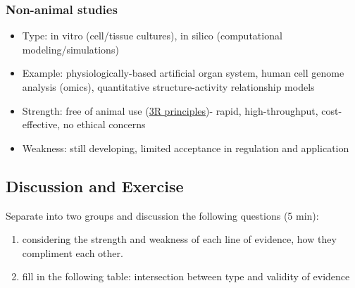 \documentclass[
  letterpaper,
  DIV=11,
  numbers=noendperiod]{scrartcl}
\begin{document}
\subsubsection{Non-animal studies}\label{non-animal-studies}

\begin{itemize}
\item
  Type: in vitro (cell/tissue cultures), in silico (computational
  modeling/simulations)
\item
  Example: physiologically-based artificial organ system, human cell
  genome analysis (omics), quantitative structure-activity relationship
  models
\item
  Strength: free of animal use
  (\href{https://ki.se/en/research/popular-science-and-dialogue/animal-research/the-principles-of-3r}{3R
  principles})- rapid, high-throughput, cost-effective, no ethical
  concerns
\item
  Weakness: still developing, limited acceptance in regulation and
  application
\end{itemize}

\subsection{Discussion and Exercise}\label{discussion-and-exercise}

Separate into two groups and discussion the following questions (5 min):

\begin{enumerate}
\def\labelenumi{\arabic{enumi}.}
\item
  considering the strength and weakness of each line of evidence, how
  they compliment each other.
\item
  fill in the following table: intersection between type and validity of
  evidence
\end{enumerate}
\end{document}
